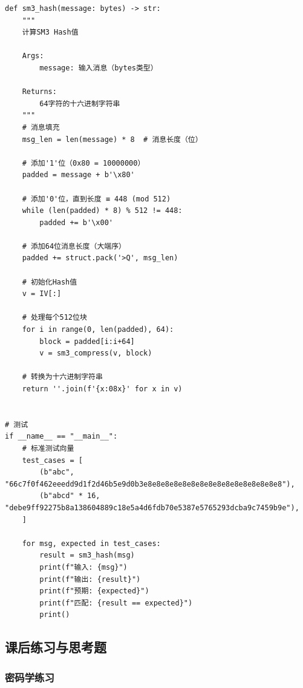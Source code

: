 ﻿\documentclass[12pt,a4paper]{article}
\begin{document}
\begin{lstlisting}
def sm3_hash(message: bytes) -> str:
    """
    计算SM3 Hash值
    
    Args:
        message: 输入消息（bytes类型）
    
    Returns:
        64字符的十六进制字符串
    """
    # 消息填充
    msg_len = len(message) * 8  # 消息长度（位）
    
    # 添加'1'位（0x80 = 10000000）
    padded = message + b'\x80'
    
    # 添加'0'位，直到长度 ≡ 448 (mod 512)
    while (len(padded) * 8) % 512 != 448:
        padded += b'\x00'
    
    # 添加64位消息长度（大端序）
    padded += struct.pack('>Q', msg_len)
    
    # 初始化Hash值
    v = IV[:]
    
    # 处理每个512位块
    for i in range(0, len(padded), 64):
        block = padded[i:i+64]
        v = sm3_compress(v, block)
    
    # 转换为十六进制字符串
    return ''.join(f'{x:08x}' for x in v)


# 测试
if __name__ == "__main__":
    # 标准测试向量
    test_cases = [
        (b"abc", "66c7f0f462eeedd9d1f2d46b5e9d0b3e8e8e8e8e8e8e8e8e8e8e8e8e8e8e8e8"),
        (b"abcd" * 16, "debe9ff92275b8a138604889c18e5a4d6fdb70e5387e5765293dcba9c7459b9e"),
    ]
    
    for msg, expected in test_cases:
        result = sm3_hash(msg)
        print(f"输入: {msg}")
        print(f"输出: {result}")
        print(f"预期: {expected}")
        print(f"匹配: {result == expected}")
        print()
\end{lstlisting}

\subsection{课后练习与思考题}

\subsubsection{密码学练习}
\end{document}
